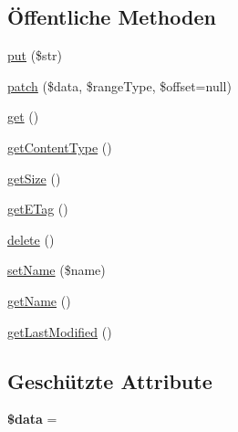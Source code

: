 \subsection*{Öffentliche Methoden}
\begin{DoxyCompactItemize}
\item 
\mbox{\hyperlink{class_sabre_1_1_d_a_v_1_1_partial_update_1_1_file_mock_a5e51061006ed5f5ce10e514fa11ae209}{put}} (\$str)
\item 
\mbox{\hyperlink{class_sabre_1_1_d_a_v_1_1_partial_update_1_1_file_mock_a93dea351066cf42f5e0e810ffa4f9b31}{patch}} (\$data, \$range\+Type, \$offset=null)
\item 
\mbox{\hyperlink{class_sabre_1_1_d_a_v_1_1_partial_update_1_1_file_mock_aea1fec1a2850e1508a2f02a04a8ed7e8}{get}} ()
\item 
\mbox{\hyperlink{class_sabre_1_1_d_a_v_1_1_partial_update_1_1_file_mock_a579203d7c6b0516a0fe0bd27f83ff275}{get\+Content\+Type}} ()
\item 
\mbox{\hyperlink{class_sabre_1_1_d_a_v_1_1_partial_update_1_1_file_mock_aba348d3355af18e1b1bd8e54674e07f5}{get\+Size}} ()
\item 
\mbox{\hyperlink{class_sabre_1_1_d_a_v_1_1_partial_update_1_1_file_mock_ac3cb7c33686234052db8f3b870822cc9}{get\+E\+Tag}} ()
\item 
\mbox{\hyperlink{class_sabre_1_1_d_a_v_1_1_partial_update_1_1_file_mock_a0023f633696c76be41a23d276c07cc10}{delete}} ()
\item 
\mbox{\hyperlink{class_sabre_1_1_d_a_v_1_1_partial_update_1_1_file_mock_acf0b86fd1a91b7795bc565831f302f15}{set\+Name}} (\$name)
\item 
\mbox{\hyperlink{class_sabre_1_1_d_a_v_1_1_partial_update_1_1_file_mock_a9f6898974521e0424de1078d6e2a9096}{get\+Name}} ()
\item 
\mbox{\hyperlink{class_sabre_1_1_d_a_v_1_1_partial_update_1_1_file_mock_af20087b574c63fe429a5e4c730ef80c4}{get\+Last\+Modified}} ()
\end{DoxyCompactItemize}
\subsection*{Geschützte Attribute}
\begin{DoxyCompactItemize}
\item 
\mbox{\label{class_sabre_1_1_d_a_v_1_1_partial_update_1_1_file_mock_a67864a074be2ddf700864e04125a7248}} 
{\bfseries \$data} = \textquotesingle{}\textquotesingle{}
\end{DoxyCompactItemize}


